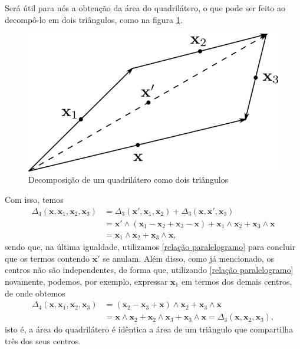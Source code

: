\documentclass[
	12pt,
	oneside,			%
	a4paper,			%
	english,			%
	brazil				%
	]{abntex2}
\theoremstyle{definition}
\begin{document}
\begin{apendicesenv}
Será útil para nós a obtenção da área do quadrilátero, o que pode ser feito ao decompô-lo em dois triângulos, como na figura \ref{decomposição_quadrilatero}.
\begin{figure}[H]
    \includegraphics[width=.6\textwidth]{Imagens/decomposição_quadrilatero.png}
    \centering
    \caption{Decomposição de um quadrilátero como dois triângulos}
    \label{decomposição_quadrilatero}
\end{figure}

Com isso, temos
\begin{equation}
    \label{desenvolvimento area quadrilatero}
    \begin{aligned}
        \Delta_4\left(\mathbf{x},\mathbf{x}_1,\mathbf{x}_2,\mathbf{x}_3 \right) & = \Delta_3\left(\mathbf{x}',\mathbf{x}_1,\mathbf{x}_2\right) + \Delta_3\left(\mathbf{x},\mathbf{x}',\mathbf{x}_3 \right) \\ &=  \mathbf{x}' \wedge \left( \mathbf{x}_1 - \mathbf{x}_2 + \mathbf{x}_3 - \mathbf{x} \right) + \mathbf{x}_1 \wedge \mathbf{x}_2  + \mathbf{x}_3 \wedge \mathbf{x}  \\ &= \mathbf{x}_1 \wedge \mathbf{x}_2 + \mathbf{x}_3 \wedge \mathbf{x},
    \end{aligned}
\end{equation}
sendo que, na última igualdade, utilizamos \eqref{relação paralelogramo} para concluir que os termos contendo $\mathbf{x}'$ se anulam. Além disso, como já mencionado, os centros não são independentes, de forma que, utilizando \eqref{relação paralelogramo} novamente, podemos, por exemplo, expressar $\mathbf{x}_1$ em termos dos demais centros, de onde obtemos
\begin{equation}
\label{quadrilatero como triangulo}
    \begin{aligned}
        \Delta_4\left(\mathbf{x},\mathbf{x}_1,\mathbf{x}_2,\mathbf{x}_3 \right) &= \left( \mathbf{x}_2 - \mathbf{x}_3 + \mathbf{x} \right) \wedge \mathbf{x}_2 + \mathbf{x}_3 \wedge \mathbf{x} \\
        &= \mathbf{x}  \wedge \mathbf{x}_2 + \mathbf{x}_2 \wedge \mathbf{x}_3 + \mathbf{x}_3 \wedge \mathbf{x} = \Delta_3 \left( \mathbf{x}, \mathbf{x}_2,\mathbf{x}_3 \right),
    \end{aligned}
\end{equation}
isto é, a área do quadrilátero é idêntica a área de um triângulo que compartilha três dos seus centros.


\end{apendicesenv}
\end{document}
